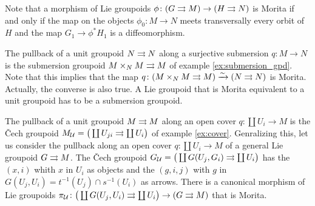 Note  that a morphism of Lie groupoids $\phi\colon (G\rightrightarrows M)\to (H\rightrightarrows N)$ is Morita if and only if the map on the objects $\phi_0\colon M\to N$ meets transversally every orbit of $H$ and the map $G_1\to \phi^*H_1$ is a diffeomorphism.

\begin{example}\label{ex:submersion_gpd_pb}
The pullback of a unit groupoid $N\rightrightarrows N$ along a surjective submersion $q\colon M\to N$ is the submersion groupoid $M\times_N M\rightrightarrows M$ of example \ref{ex:submersion_gpd}.
Note that this implies that the map
\( q\colon (M\times_N M\rightrightarrows M) \xrightarrow\sim  (N\rightrightarrows N) \)
is Morita.
Actually, the converse is also true.
A Lie groupoid that is Morita equivalent to a unit groupoid has to be a submersion groupoid.
\end{example}

\begin{example}\label{ex:cech}
The pullback of a unit groupoid $M\rightrightarrows M$ along an open cover $q\colon \coprod U_i \to M$ is the \v Cech groupoid
\( M_{\mathcal{U}} = \big( \coprod U_{ji}\rightrightarrows \coprod U_i \big) \)
of example \ref{ex:cover}.
Genralizing this, let us consider the pullback along an open cover $q\colon \coprod U_i \to M$ of a general Lie groupoid $G\rightrightarrows M$.
The \v Cech groupoid
\( G_{\mathcal{U}} = \big( \coprod G(U_j,G_i)\rightrightarrows \coprod U_i \big) \)
has the $(x,i)$ whith $x$ in $U_i$ as objects and the $(g,i,j)$ with $g$ in $G(U_j,U_i) = t^{-1}(U_j)\cap s^{-1}(U_i)$ as arrows.
There is a canonical morphism of Lie groupoids
\( \pi_{\mathcal{U}}\colon \big( \coprod G(U_j,U_i) \rightrightarrows \coprod U_i \big) \to (G \rightrightarrows M) \)
that is Morita.
\end{example}
